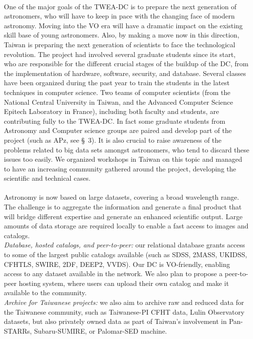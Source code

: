 \\
One of the major goals of the TWEA-DC is to prepare the next generation of astronomers, who will have to keep in pace with the changing face of modern astronomy. Moving into the VO era will have a dramatic impact on the existing skill base of young astronomers. Also, by making a move now in this direction, Taiwan is preparing the next generation of scientists to face the technological revolution. The project had involved several graduate students since its start, who are responsible for the different crucial stages of the buildup of the DC, from the implementation of hardware, software, security, and database. Several classes have been organized during the past year to train the students in the latest techniques in computer science. Two teams of computer scientists (from the National Central University in Taiwan, and the Advanced Computer Science Epitech Laboratory in France), including both faculty and students, are contributing fully to the TWEA-DC. In fact some graduate students from Astronomy and Computer science groups are paired and develop part of the project (such as APz, see \S~3).
It is also crucial to raise awareness of the problems related to big data sets amongst astronomers, who tend to discard these issues too easily. We organized workshops in Taiwan on this topic and managed to have an increasing community gathered around the project, developing the scientific and technical cases.\\

\\
Astronomy is now based on large datasets, covering a broad wavelength range. The challenge is to aggregate the information and generate a final product that will bridge different expertise and generate an enhanced scientific output. Large amounts of data storage are required locally to enable a fast access to images and catalogs.  \\ 
{\it Database, hosted catalogs, and peer-to-peer:} our relational database grants access to some of the largest public catalogs available (such as SDSS, 2MASS, UKIDSS, CFHTLS, SWIRE, 2DF, DEEP2, VVDS). Our DC is VO-friendly, enabling access to any dataset available in the network. We also plan to propose a peer-to-peer hosting system, where users can upload their own catalog and make it available to the community.\\
{\it Archive for Taiwanese projects:} we also aim to archive raw and reduced data for the Taiwanese community, such as Taiwanese-PI CFHT data, Lulin Observatory datasets, but also privately owned data as part of Taiwan's involvement in Pan-STARRs, Subaru-SUMIRE, or Palomar-SED machine.\\


